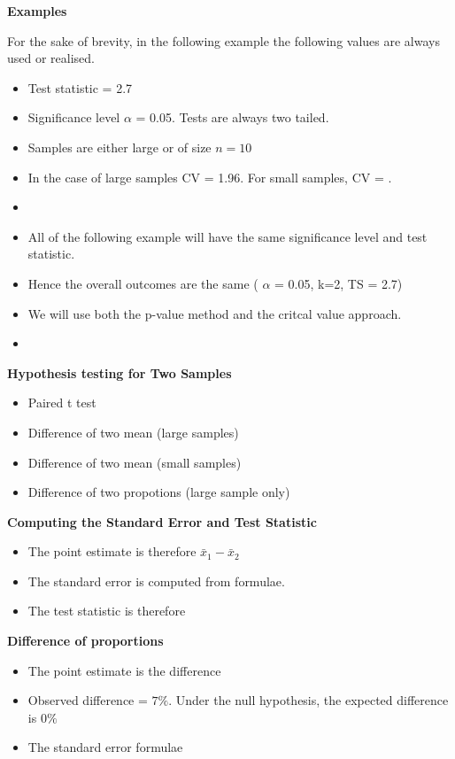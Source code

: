 {\textbf{Examples}

For the sake of brevity, in the following example the following values are always used or realised.

\begin{itemize}
\item Test statistic  = 2.7
\item Significance level $\alpha$ = 0.05. Tests are always two tailed.
\item Samples are either large or of size $n = 10$
\item In the case of large samples CV = 1.96. For small samples, CV = .
\item
\end{itemize}

\begin{itemize}
\item All of the following example will have the same significance level and test statistic.
\item Hence the overall outcomes are the same ( $\alpha$ = 0.05, k=2, TS = 2.7)
\item We will use both the p-value method and the critcal value approach.
\item 
\end{itemize}


\textbf{Hypothesis testing for Two Samples}

\begin{itemize}
\item Paired t test
\item Difference of two mean (large samples)
\item Difference of two mean (small samples)
\item Difference of two propotions (large sample only)
\end{itemize}


\textbf{Computing the Standard Error and Test Statistic }
\begin{itemize}
\item The point estimate is therefore $\bar{x}_1 -\bar{x}_2$
\item The standard error is computed from formulae.
\item The test statistic is therefore 
\end{itemize}

\textbf{Difference of proportions}

\begin{itemize}
\item The point estimate is the difference 
\item Observed difference  = $7\%$. Under the null hypothesis, the expected difference is $0\%$
\item The standard error formulae
\end{itemize}





}
